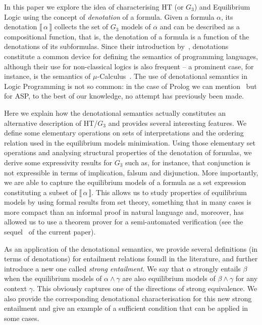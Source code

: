\documentclass{tlp}
\newcommand{\den}[1]{\llbracket \, #1 \, \rrbracket}
\begin{document}
In this paper we explore the idea of characterising HT (or $G_3$) and Equilibrium Logic using the concept of \emph{denotation} of a formula. Given a formula $\alpha$, its denotation $\den\alpha$ collects the set of $G_3$ models of $\alpha$ and can be described as a compositional function, that is, the denotation of a formula is a function of the denotations of its subformulas. Since their introduction by~\cite{SS71}, denotations constitute a common device for defining the semantics of programming languages, although their use for non-classical logics is also frequent -- a prominent case, for instance, is the semantics of $\mu$-Calculus~\cite{Koz83}. The use of denotational semantics in Logic Programming is not so common: in the case of Prolog we can mention~\cite{NF89} but for ASP, to the best of our knowledge, no attempt has previously been made.

Here we explain how the denotational semantics actually constitutes an alternative description of HT/$G_3$ and provides several interesting features. We define some elementary operations on sets of interpretations and the ordering relation used in the equilibrium models minimisation. Using those elementary set operations and analysing structural properties of the denotation of formulas, we derive some expressivity results for $G_3$ such as, for instance, that conjunction is not expressible in terms of implication, falsum and disjunction. More importantly, we are able to capture the equilibrium models of a formula as a set expression constituting a subset of $\den\alpha$. This allows us to study properties of equilibrium models by using formal results from set theory, something that in many cases is more compact than an informal proof in natural language and, moreover, has allowed us to use a theorem prover for a semi-automated verification (see the sequel~\cite{CMMSE15} of the current paper).

As an application of the denotational semantics, we provide several definitions (in terms of denotations) for entailment relations foundl in the literature, and further introduce a new one called \emph{strong entailment}. We say that $\alpha$ strongly entails $\beta$ when the equilibrium models of $\alpha \wedge \gamma$ are also equilibrium models of $\beta \wedge \gamma$ for any context $\gamma$. This obviously captures one of the directions of strong equivalence. We also provide the corresponding denotational characterisation for this new strong entailment and give an example of a sufficient condition that can be applied in some cases.
\end{document}
